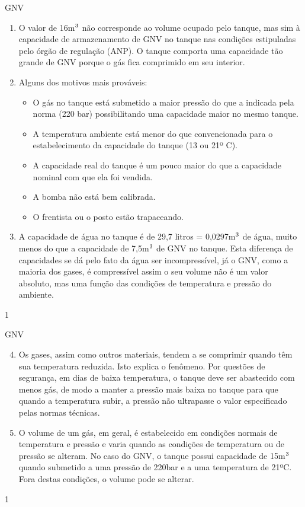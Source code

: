 \begin{answer}{GNV}
{
\begin{enumerate}
\item {} 
O valor de 16m\(\sp{\text{3}}\) não corresponde ao volume ocupado pelo tanque, mas sim à capacidade de armazenamento de GNV no tanque nas condições estipuladas pelo órgão de regulação (ANP). O tanque comporta uma capacidade tão grande de GNV porque o gás fica comprimido em seu interior.

\item {} 
Alguns dos motivos mais prováveis:

\begin{itemize}
\item {} 
O gás no tanque está submetido a maior pressão do que a indicada pela norma (220 bar) possibilitando uma capacidade maior no mesmo tanque.

\item {} 
A temperatura ambiente está menor do que convencionada para o estabelecimento da capacidade do tanque (13 ou 21º C).

\item {} 
A capacidade real do tanque é um pouco maior do que a capacidade nominal com que ela foi vendida.

\item {} 
A bomba não está bem calibrada.

\item {} 
O frentista ou o posto estão trapaceando.

\end{itemize}

\item {} 
A capacidade de água no tanque é de 29,7 litros = 0,0297m\(\sp{\text{3}}\) de água, muito menos do que a capacidade de 7,5m\(\sp{\text{3}}\) de GNV no tanque. Esta diferença de capacidades se dá pelo fato da água ser incompressível, já o GNV, como a maioria dos gases, é compressível assim o seu volume não é um valor absoluto, mas uma função das condições de temperatura e pressão do ambiente.

\end{enumerate}
}{1}
\end{answer}
\clearmargin
\begin{answer}{GNV}
{
\begin{enumerate}\setcounter{enumi}{3}
\item {} 
Os gases, assim como outros materiais, tendem a se comprimir quando têm sua temperatura reduzida. Isto explica o fenômeno. Por questões de segurança, em dias de baixa temperatura, o tanque deve ser abastecido com menos gás, de modo a manter a pressão mais baixa no tanque para que quando a temperatura subir, a pressão não ultrapasse o valor especificado pelas normas técnicas.

\item {} 
O volume de um gás, em geral, é estabelecido em condições normais de temperatura e pressão e varia quando as condições de temperatura ou de pressão se alteram. No caso do GNV, o tanque possui capacidade de 15m\(\sp{\text{3}}\) quando submetido a uma pressão de 220bar e a uma temperatura de 21ºC. Fora destas condições, o volume pode se alterar.
\end{enumerate}
}{1}
\end{answer}
